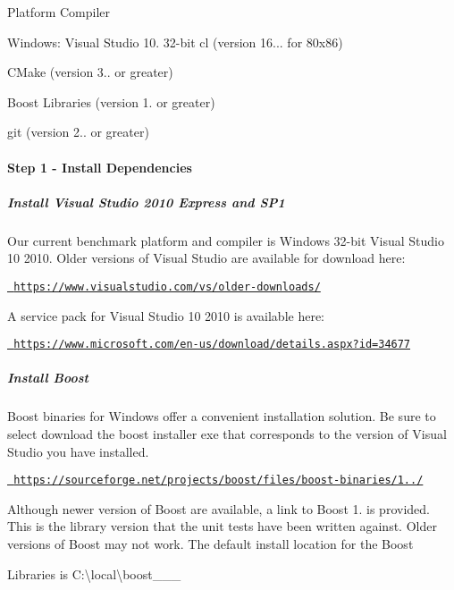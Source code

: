 \begin{DoxyItemize}
\item Platform Compiler
\begin{DoxyItemize}
\item Windows\+: Visual Studio 10. 32-\/bit cl (version 16... for 80x86)
\end{DoxyItemize}
\item C\+Make (version 3.. or greater)
\item Boost Libraries (version 1. or greater)
\item git (version 2.. or greater)
\end{DoxyItemize}

\paragraph*{Step 1 -\/ Install Dependencies}

\subparagraph*{Install Visual Studio 2010 Express and S\+P1}

Our current benchmark platform and compiler is Windows 32-\/bit Visual Studio 10 2010. Older versions of Visual Studio are available for download here\+:

\href{https://www.visualstudio.com/vs/older-downloads/}{\texttt{ https\+://www.\+visualstudio.\+com/vs/older-\/downloads/}}

A service pack for Visual Studio 10 2010 is available here\+:

\href{https://www.microsoft.com/en-us/download/details.aspx?id=34677}{\texttt{ https\+://www.\+microsoft.\+com/en-\/us/download/details.\+aspx?id=34677}}

\subparagraph*{Install Boost}

Boost binaries for Windows offer a convenient installation solution. Be sure to select download the boost installer exe that corresponds to the version of Visual Studio you have installed.

\href{https://sourceforge.net/projects/boost/files/boost-binaries/1.58.0/}{\texttt{ https\+://sourceforge.\+net/projects/boost/files/boost-\/binaries/1../}}

Although newer version of Boost are available, a link to Boost 1. is provided. This is the library version that the unit tests have been written against. Older versions of Boost may not work. The default install location for the Boost

Libraries is {\ttfamily C\+:\textbackslash{}local\textbackslash{}boost\+\_\+\_\+\_}

